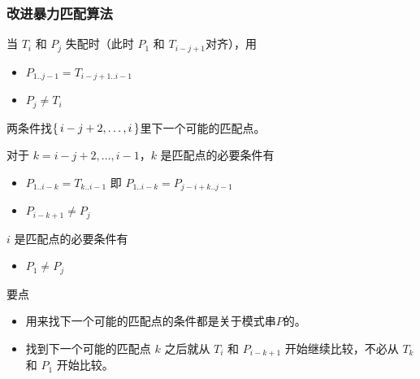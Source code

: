 \documentclass{ctexbeamer}
\begin{document}
\begin{frame}[fragile]
\frametitle{改进暴力匹配算法}


当 $T_i$ 和 $P_j$ 失配时（此时 $P_1$ 和 $T_{i - j + 1}$对齐），用
\begin{itemize}
\item $P_{1..j-1} = T_{i - j + 1..i-1}$
\item $P_j \ne T_i$
\end{itemize}
两条件找$\set{i - j + 2, \dots, i}$里下一个可能的匹配点。

\begin{block}{}
对于 $k = i - j + 2, \dots, i - 1$，$k$ 是匹配点的必要条件有
\begin{itemize}
\item $P_{1..i-k} = T_{k..i-1} $ 即 $P_{1..i-k} = P_{j - i+k ..j - 1}$
\item $P_{i - k + 1} \ne P_j$
\end{itemize}

$i$ 是匹配点的必要条件有
\begin{itemize}
\item $P_1 \ne P_j$
\end{itemize}

\end{block}


\begin{block}{要点}
\begin{itemize}
\item 用来找下一个可能的匹配点的条件都是关于模式串$P$的。
\item 找到下一个可能的匹配点 $k$ 之后就从 $T_i$ 和 $P_{i - k + 1}$ 开始继续比较，不必从 $T_k$ 和 $P_1$ 开始比较。
\end{itemize}
\end{block}

\end{frame}
\end{document}

